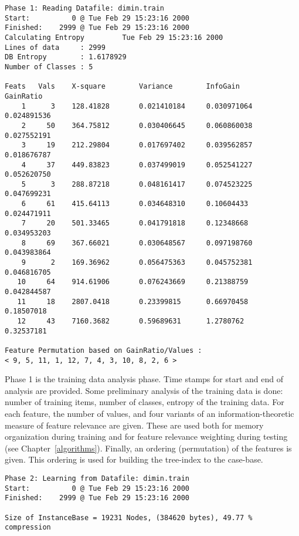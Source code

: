 \documentclass{report}
\begin{document}
{\small
\begin{verbatim}
Phase 1: Reading Datafile: dimin.train
Start:          0 @ Tue Feb 29 15:23:16 2000
Finished:    2999 @ Tue Feb 29 15:23:16 2000
Calculating Entropy         Tue Feb 29 15:23:16 2000
Lines of data     : 2999
DB Entropy        : 1.6178929
Number of Classes : 5
 
Feats   Vals    X-square        Variance        InfoGain        GainRatio
    1      3    128.41828       0.021410184     0.030971064     0.024891536
    2     50    364.75812       0.030406645     0.060860038     0.027552191
    3     19    212.29804       0.017697402     0.039562857     0.018676787
    4     37    449.83823       0.037499019     0.052541227     0.052620750
    5      3    288.87218       0.048161417     0.074523225     0.047699231
    6     61    415.64113       0.034648310     0.10604433      0.024471911
    7     20    501.33465       0.041791818     0.12348668      0.034953203
    8     69    367.66021       0.030648567     0.097198760     0.043983864
    9      2    169.36962       0.056475363     0.045752381     0.046816705
   10     64    914.61906       0.076243669     0.21388759      0.042844587
   11     18    2807.0418       0.23399815      0.66970458      0.18507018
   12     43    7160.3682       0.59689631      1.2780762       0.32537181
 
Feature Permutation based on GainRatio/Values :
< 9, 5, 11, 1, 12, 7, 4, 3, 10, 8, 2, 6 >                  
\end{verbatim}
}

\hline
\vspace{1cm}

Phase 1 is the training data analysis phase. Time stamps for start and
end of analysis are provided. Some preliminary analysis of the
training data is done: number of training items, number of classes,
entropy of the training data. For each feature, the number of values,
and four variants of an information-theoretic measure of feature
relevance are given. These are used both for memory organization
during training and for feature relevance weighting during testing
(see Chapter~\ref{algorithms}). Finally, an ordering (permutation) of
the features is given. This ordering is used for building the
tree-index to the case-base.

\vspace{1cm}
\hline

{\small
\begin{verbatim}
Phase 2: Learning from Datafile: dimin.train
Start:          0 @ Tue Feb 29 15:23:16 2000
Finished:    2999 @ Tue Feb 29 15:23:16 2000
 
Size of InstanceBase = 19231 Nodes, (384620 bytes), 49.77 % compression           
\end{verbatim}
}
\end{document}
